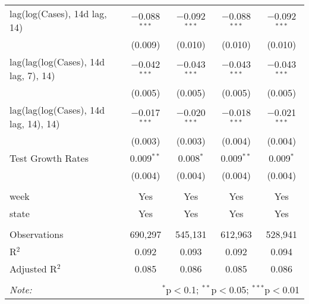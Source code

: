 \begin{tabular}{@{\extracolsep{1pt}}lcccc}
  lag(log(Cases), 14d lag, 14) & $-$0.088$^{***}$ & $-$0.092$^{***}$ & $-$0.088$^{***}$ & $-$0.092$^{***}$ \\ 
  & (0.009) & (0.010) & (0.010) & (0.010) \\ 
  lag(lag(log(Cases), 14d lag, 7), 14) & $-$0.042$^{***}$ & $-$0.043$^{***}$ & $-$0.043$^{***}$ & $-$0.043$^{***}$ \\ 
  & (0.005) & (0.005) & (0.005) & (0.005) \\ 
  lag(lag(log(Cases), 14d lag, 14), 14) & $-$0.017$^{***}$ & $-$0.020$^{***}$ & $-$0.018$^{***}$ & $-$0.021$^{***}$ \\ 
  & (0.003) & (0.003) & (0.004) & (0.004) \\ 
  Test Growth Rates & 0.009$^{**}$ & 0.008$^{*}$ & 0.009$^{**}$ & 0.009$^{*}$ \\ 
  & (0.004) & (0.004) & (0.004) & (0.004) \\ 
 \hline \\[-1.8ex] 
week & Yes & Yes & Yes & Yes \\ 
state & Yes & Yes & Yes & Yes \\ 
\hline \\[-1.8ex] 
Observations & 690,297 & 545,131 & 612,963 & 528,941 \\ 
R$^{2}$ & 0.092 & 0.093 & 0.092 & 0.094 \\ 
Adjusted R$^{2}$ & 0.085 & 0.086 & 0.085 & 0.086 \\ 
\hline 
\hline \\[-1.8ex] 
\textit{Note:}  & \multicolumn{4}{r}{$^{*}$p$<$0.1; $^{**}$p$<$0.05; $^{***}$p$<$0.01} \\ 
\end{tabular} 